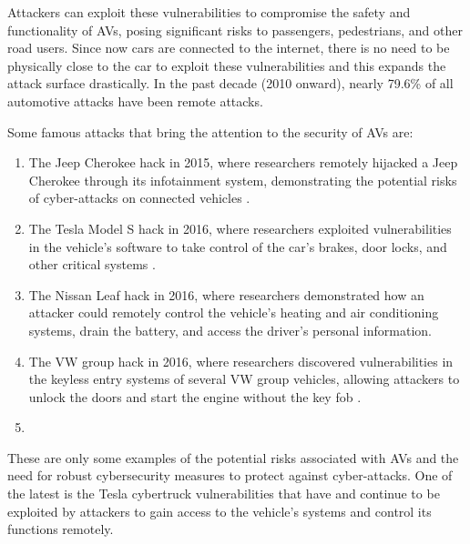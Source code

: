 Attackers can exploit these vulnerabilities to compromise the safety and functionality of AVs, posing significant risks to passengers, pedestrians, and other road users.
Since now cars are connected to the internet, there is no need to be physically close to the car to exploit these vulnerabilities and this expands the attack surface drastically.
In the past decade (2010 onward), nearly 79.6\% of all automotive attacks have been
remote attacks.

Some famous attacks that bring the attention to the security of AVs are:
\begin{enumerate}
    \item The Jeep Cherokee hack in 2015, where researchers remotely hijacked a Jeep Cherokee through its infotainment system, demonstrating the potential risks of cyber-attacks on connected vehicles \cite{miller2015remote} .
    \item The Tesla Model S hack in 2016, where researchers exploited vulnerabilities in the vehicle's software to take control of the car's brakes, door locks, and other critical systems \cite{tesla_hack}.
    \item The Nissan Leaf hack in 2016, where researchers demonstrated how an attacker could remotely control the vehicle's heating and air conditioning systems, drain the battery, and access the driver's personal information.
    \item The VW group hack in 2016, where researchers discovered vulnerabilities in the keyless entry systems of several VW group vehicles, allowing attackers to unlock the doors and start the engine without the key fob \cite{garcia2016lock}.
\item \end{enumerate}

These are only some examples of the potential risks associated with AVs and the need for robust cybersecurity measures to protect against cyber-attacks.
One of the latest is the Tesla cybertruck vulnerabilities that have and continue to be exploited by attackers to gain access to the vehicle's systems and control its functions remotely.



























